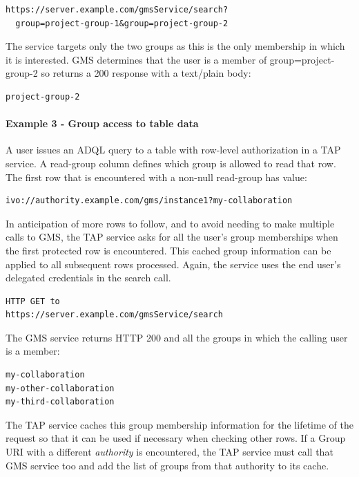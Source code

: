 \documentclass[11pt,a4paper]{ivoa}
\begin{document}
\begin{verbatim}
https://server.example.com/gmsService/search?
  group=project-group-1&group=project-group-2
\end{verbatim}

The service targets only the two groups as this is the only membership in which it is interested.  GMS determines that the user is a member of group=project-group-2 so returns a 200 response with a text/plain body:

\begin{verbatim}
project-group-2
\end{verbatim}

\paragraph{Example 3 - Group access to table data}

A user issues an ADQL query to a table with row-level authorization in a TAP service.  A read-group column defines which group is allowed to read that row.  The first row that is encountered with a non-null read-group has value:

\begin{verbatim}
ivo://authority.example.com/gms/instance1?my-collaboration
\end{verbatim}

In anticipation of more rows to follow, and to avoid needing to make multiple calls to GMS, the TAP service asks for all the user's group memberships when the first protected row is encountered.  This cached group information can be applied to all subsequent rows processed.  Again, the service uses the end user's delegated credentials in the search call.

\begin{verbatim}
HTTP GET to
https://server.example.com/gmsService/search
\end{verbatim}

The GMS service returns HTTP 200 and all the groups in which the calling user is a member:

\begin{verbatim}
my-collaboration
my-other-collaboration
my-third-collaboration
\end{verbatim}

The TAP service caches this group membership information for the lifetime of the request so that it can be used if necessary when checking other rows.  If a Group URI with a different \emph{authority} is encountered, the TAP service must call that GMS service too and add the list of groups from that authority to its cache.
\end{document}
